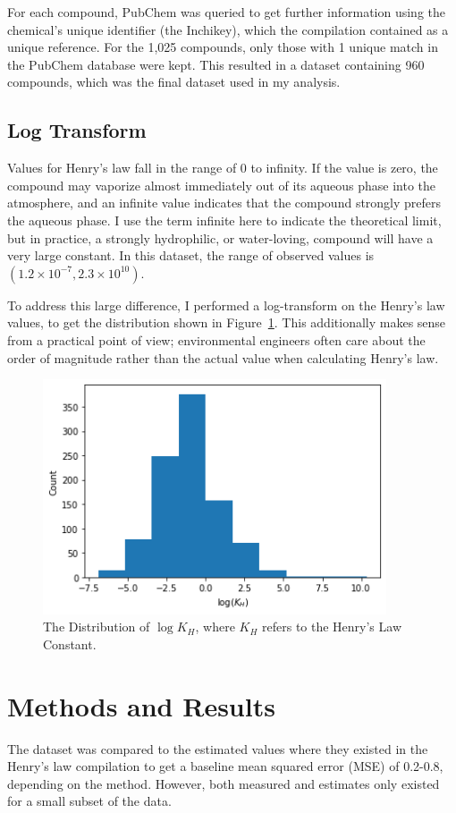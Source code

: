 \documentclass[12pt, oneside]{article}   	%
\begin{document}
For each compound, PubChem was queried to get further information using the chemical's unique identifier (the Inchikey), which the compilation contained as a unique reference. For the 1,025 compounds, only those with 1 unique match in the PubChem database were kept. This resulted in a dataset containing 960 compounds, which was the final dataset used in my analysis.

\subsection{Log Transform}
Values for Henry's law fall in the range of 0 to infinity. If the value is zero, the compound may vaporize almost immediately out of its aqueous phase into the atmosphere, and an infinite value indicates that the compound strongly prefers the aqueous phase. I use the term infinite here to indicate the theoretical limit, but in practice, a strongly hydrophilic, or water-loving, compound will have a very large constant. In this dataset, the range of observed values is $(1.2\times10^{-7}, 2.3\times 10^{10})$. %

To address this large difference, I performed a log-transform on the Henry's law values, to get the distribution shown in Figure~\ref{fig:dist}. This additionally makes sense from a practical point of view; environmental engineers often care about the order of magnitude rather than the actual value when calculating Henry's law.

\begin{figure}[h!] %
   \centering
   \includegraphics[width=4in]{data-dist.png} 
   \caption{The Distribution of $\log K_H$, where $K_H$ refers to the Henry's Law Constant.}
   \label{fig:dist}
\end{figure}


\section{Methods and Results}
The dataset was compared to the estimated values where they existed in the Henry's law compilation to get a baseline mean squared error (MSE) of 0.2-0.8, depending on the method. However, both measured and estimates only existed for a small subset of the data.
\end{document}
